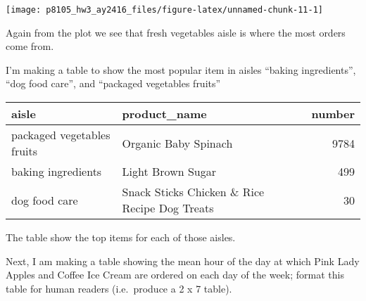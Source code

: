 \documentclass[]{article}
\newenvironment{Shaded}{\begin{snugshade}}{\end{snugshade}}
\newcommand{\KeywordTok}[1]{\textcolor[rgb]{0.13,0.29,0.53}{\textbf{#1}}}
\newcommand{\DataTypeTok}[1]{\textcolor[rgb]{0.13,0.29,0.53}{#1}}
\newcommand{\DecValTok}[1]{\textcolor[rgb]{0.00,0.00,0.81}{#1}}
\newcommand{\StringTok}[1]{\textcolor[rgb]{0.31,0.60,0.02}{#1}}
\newcommand{\OperatorTok}[1]{\textcolor[rgb]{0.81,0.36,0.00}{\textbf{#1}}}
\newcommand{\NormalTok}[1]{#1}
\begin{document}
\texttt{[image: p8105\_hw3\_ay2416\_files/figure-latex/unnamed-chunk-11-1]}

Again from the plot we see that fresh vegetables aisle is where the most
orders come from.

I'm making a table to show the most popular item in aisles ``baking
ingredients'', ``dog food care'', and ``packaged vegetables fruits''

\begin{Shaded}
\end{Shaded}

\begin{longtable}[]{@{}llr@{}}
\toprule
aisle & product\_name & number\tabularnewline
\midrule
\endhead
packaged vegetables fruits & Organic Baby Spinach & 9784\tabularnewline
baking ingredients & Light Brown Sugar & 499\tabularnewline
dog food care & Snack Sticks Chicken \& Rice Recipe Dog Treats &
30\tabularnewline
\bottomrule
\end{longtable}

The table show the top items for each of those aisles.

Next, I am making a table showing the mean hour of the day at which Pink
Lady Apples and Coffee Ice Cream are ordered on each day of the week;
format this table for human readers (i.e.~produce a 2 x 7 table).
\end{document}
